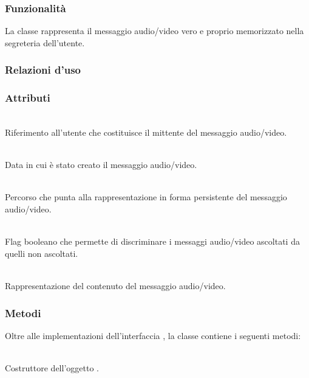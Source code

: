 \subsubsection*{Funzionalità}
La classe rappresenta il messaggio audio/video vero e proprio memorizzato nella segreteria dell'utente.

\subsubsection*{Relazioni d'uso}

\subsubsection*{Attributi}
\begin{description}
  \item{}\\
Riferimento all'utente che costituisce il mittente del messaggio audio/video.
  \item{}\\
Data in cui è stato creato il messaggio audio/video.
  \item{}\\
Percorso che punta alla rappresentazione in forma persistente del messaggio audio/video.
  \item{}\\
Flag booleano che permette di discriminare i messaggi audio/video ascoltati da quelli non ascoltati.
  \item{}\\
Rappresentazione del contenuto del messaggio audio/video.
\end{description}

\subsubsection*{Metodi}
Oltre alle implementazioni dell'interfaccia , la classe contiene i seguenti metodi:
\begin{description}
  \item{}\\
Costruttore dell'oggetto .
\end{description}


